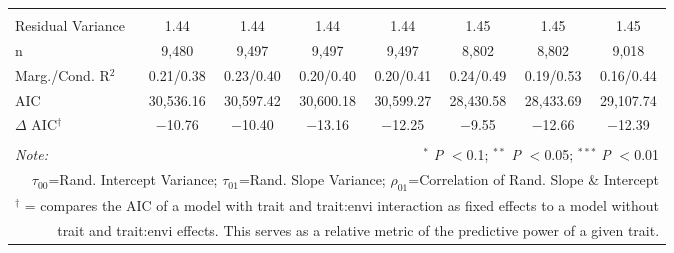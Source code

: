 \documentclass[12pt, letterpaper]{article}
\begin{document}
\begin{table}[h]
{\begin{tabular}{lccccccc}
\hline \\[-1.8ex] 
\rowcolor[gray]{.95} Residual Variance & 1.44 & 1.44 & 1.44 & 1.44 & 1.45 & 1.45 & 1.45 \\
n & 9,480 & 9,497 & 9,497 & 9,497 & 8,802 & 8,802 & 9,018 \\ 
\rowcolor[gray]{.95} Marg./Cond. R$^2$ & 0.21/0.38 & 0.23/0.40	& 0.20/0.40 & 0.20/0.41	& 0.24/0.49 & 0.19/0.53 & 0.16/0.44\\
AIC & 30,536.16 & 30,597.42 & 30,600.18 & 30,599.27 & 28,430.58 & 28,433.69 & 29,107.74 \\ 
\hline 
\rowcolor[gray]{.95}$\Delta$ AIC$^\dagger$  & $-$10.76 & $-$10.40 & $-$13.16 & $-$12.25 & $-$9.55 & $-$12.66 & $-$12.39 \\
\hline 
\hline \\[-1.8ex] 
\textit{Note:}  & \multicolumn{7}{r}{$^{*}$ \textit{P} $<$0.1; $^{**}$ \textit{P} $<$0.05; $^{***}$ \textit{P} $<$0.01}\\
\multicolumn{8}{r}{$\tau_{00}$=Rand. Intercept Variance; $\tau_{01}$=Rand. Slope Variance; $\rho_{01}$=Correlation of Rand. Slope \& Intercept}\\ 
\multicolumn{8}{r}{$^\dagger$ = compares the AIC of a model with trait and trait:envi interaction as fixed effects to a model without}\\
\multicolumn{8}{r}{trait and trait:envi effects. This serves as a relative metric of the predictive power of a given trait.}
\end{tabular}} 
\end{table} 
\end{document}
